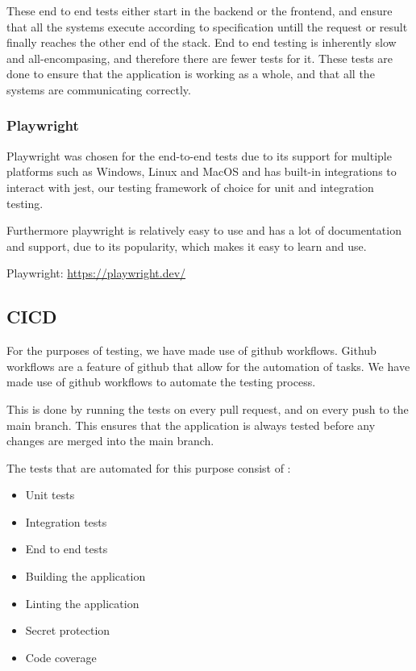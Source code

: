 \documentclass[11pt,a4paper]{article}
\begin{document}
These end to end tests either start in the backend or the frontend, and ensure
that all the systems execute according to specification untill the request or
result finally reaches the other end of the stack. End to end testing is
inherently slow and all-encompasing, and therefore there are fewer tests for it.
These tests are done to ensure that the application is working as a whole, and
that all the systems are communicating correctly.


\subsubsection*{Playwright}

Playwright was chosen for the end-to-end tests due to its support for multiple
platforms such as Windows, Linux and MacOS and has built-in integrations to
interact with jest, our testing framework of choice for unit and integration
testing. 

Furthermore playwright is relatively easy to use and has a lot of documentation
and support, due to its popularity, which makes it easy to learn and use.

Playwright: \href{https://playwright.dev/}{https://playwright.dev/}
\subsection*{CICD}

For the purposes of testing, we have made use of github workflows. Github
workflows are a feature of github that allow for the automation of tasks. We
have made use of github workflows to automate the testing process. 

This is done by running the tests on every pull request, and on every push to
the main branch. This ensures that the application is always tested before any
changes are merged into the main branch.

The tests that are automated for this purpose consist of : 
\begin{itemize}
  \item Unit tests
  \item Integration tests
  \item End to end tests
  \item Building the application
  \item Linting the application
  \item Secret protection
  \item Code coverage
\end{itemize}
\end{document}
